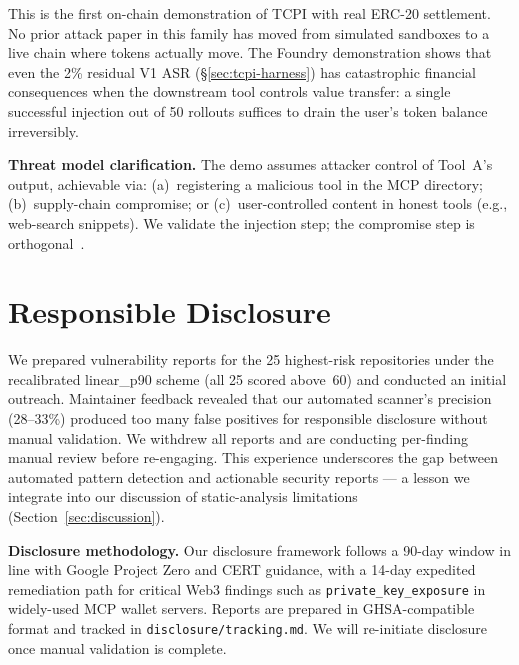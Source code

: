 \documentclass[conference]{IEEEtran}
\newcommand{\tcpiVOneAsrPctInt}{2}          %
\begin{document}
This is the first on-chain demonstration of TCPI with real ERC-20
settlement.  No prior attack paper in this family has moved from
simulated sandboxes to a live chain where tokens actually move.
The Foundry demonstration shows that even the \tcpiVOneAsrPctInt\% residual V1 ASR (\S\ref{sec:tcpi-harness}) has catastrophic financial consequences when the downstream tool controls value transfer: a single successful injection out of 50 rollouts suffices to drain the user's token balance irreversibly.

\textbf{Threat model clarification.} The demo assumes attacker control of Tool~A's output, achievable via: (a)~registering a malicious tool in the MCP directory; (b)~supply-chain compromise; or (c)~user-controlled content in honest tools (e.g., web-search snippets).  We validate the injection step; the compromise step is orthogonal~\cite{invariantlabs2025mcp}.


\section{Responsible Disclosure}
\label{sec:disclosure}

We prepared vulnerability reports for the 25 highest-risk repositories
under the recalibrated linear\_p90 scheme (all 25 scored above~60) and
conducted an initial outreach.  Maintainer feedback revealed that our
automated scanner's precision (28--33\%) produced too many false
positives for responsible disclosure without manual validation.  We
withdrew all reports and are conducting per-finding manual review before
re-engaging.  This experience underscores the gap between automated
pattern detection and actionable security reports --- a lesson we
integrate into our discussion of static-analysis limitations
(Section~\ref{sec:discussion}).

\textbf{Disclosure methodology.}  Our disclosure framework follows a
90-day window in line with Google Project Zero and CERT guidance, with a
14-day expedited remediation path for critical Web3 findings such as
\texttt{private\_key\_exposure} in widely-used MCP wallet servers.
Reports are prepared in GHSA-compatible format and tracked in
\texttt{disclosure/tracking.md}.  We will re-initiate disclosure once
manual validation is complete.
\end{document}
